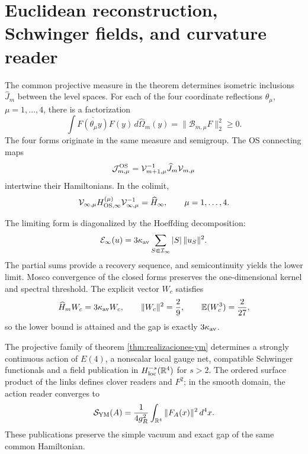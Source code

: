 \section*{Euclidean reconstruction, Schwinger fields, and curvature reader}

The common projective measure in the theorem determines isometric inclusions
\(\widehat J_m\) between the level spaces. For each of the four
coordinate reflections \(\theta_\mu\), \(\mu=1,\ldots,4\), there is a
factorization
\begin{equation}\label{eq:amp-ym-cuatro-os}
 \int\overline{F(\theta_\mu y)}F(y)\,
 d\widehat\Omega_m(y)
 =\|\mathcal B_{m,\mu}F\|_2^2\geq0.
\end{equation}
The four forms originate in the same measure and semigroup. The
OS connecting maps
\[
 \mathcal J_{m,\mu}^{\rm OS}
 =\mathcal V_{m+1,\mu}^{-1}\widehat J_m\mathcal V_{m,\mu}
\]
intertwine their Hamiltonians. In the colimit,
\begin{equation}\label{eq:amp-ym-hamiltoniano-comun}
 \mathcal V_{\infty,\mu}H_{{\rm OS},\infty}^{(\mu)}
 \mathcal V_{\infty,\mu}^{-1}
 =\widehat H_\infty,
 \qquad \mu=1,\ldots,4.
\end{equation}

The limiting form is diagonalized by the Hoeffding decomposition:
\begin{equation}\label{eq:amp-ym-forma-limite}
 \mathcal E_\infty(u)=3\kappa_{\rm av}
 \sum_{S\Subset\mathcal I_\infty}|S|\,\|u_S\|^2.
\end{equation}
The partial sums provide a recovery sequence, and
semicontinuity yields the lower limit. Mosco convergence of the
closed forms preserves the one-dimensional kernel and spectral threshold. The
explicit vector \(W_c\) satisfies
\begin{equation}\label{eq:amp-ym-testigo-gap}
 \widehat H_mW_c=3\kappa_{\rm av}W_c,
 \qquad \|W_c\|^2=\frac29,
 \qquad \mathbb E(W_c^3)=\frac2{27},
\end{equation}
so the lower bound is attained and the gap is exactly
\(3\kappa_{\rm av}\).

\begin{theorem}
\label{thm:amp-ym-terminacion}
The projective family of theorem \ref{thm:realizaciones-ym} determines a
strongly continuous action of \(E(4)\), a nonscalar local gauge net,
compatible Schwinger functionals and a field publication in
\(H^{-s}_{\rm loc}(\mathbb R^4)\) for \(s>2\). The ordered surface
product of the links defines clover readers and \(F^2\); in the smooth
domain, the action reader converges to
\begin{equation}\label{eq:amp-ym-f2}
 \mathcal S_{\rm YM}(A)
 =\frac1{4g_R^2}\int_{\mathbb R^4}\|F_A(x)\|^2\,d^4x.
\end{equation}
These publications preserve the simple vacuum and exact gap of the same
common Hamiltonian.
\end{theorem}

